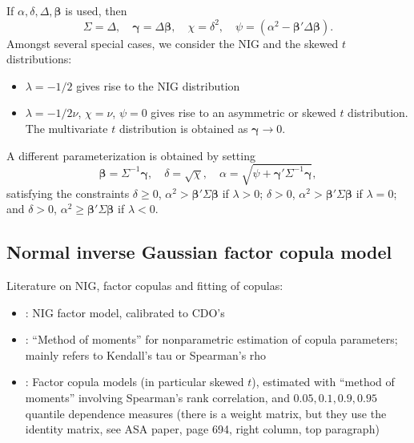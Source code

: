 \begin{definition}
If $\alpha, \delta, \Delta, \mathbf\beta$ is used, then
\begin{equation*}
  \Sigma = \Delta, \quad \mathbf\gamma = \Delta\mathbf \beta, \quad
  \chi = \delta^2, \quad \psi = (\alpha^2 - \mathbf\beta' \Delta
  \mathbf\beta). 
\end{equation*}
Amongst several special cases, we consider the NIG and the skewed $t$
distributions:
\begin{itemize}
\item $\lambda=-1/2$ gives rise to the NIG distribution
\item $\lambda=-1/2 \nu$, $\chi=\nu$, $\psi=0$ gives rise to an
  asymmetric or skewed $t$ distribution. The multivariate $t$
  distribution is obtained as $\mathbf \gamma\rightarrow 0$. 
\end{itemize}


A different parameterization is obtained by setting
\begin{equation*}
  \mathbf \beta = \Sigma^{-1}\mathbf \gamma, \quad \delta=\sqrt\chi,
  \quad \alpha = \sqrt{\psi + \mathbf \gamma' \Sigma^{-1} \mathbf
    \gamma}, 
\end{equation*}
satisfying the constraints $\delta\geq0$, $\alpha^2 > \mathbf \beta'
\Sigma\mathbf\beta$ if $\lambda>0$; $\delta>0$, $\alpha^2>
\mathbf\beta' \Sigma\mathbf \beta$ if $\lambda=0$; and $\delta>0$,
$\alpha^2\geq \mathbf\beta' \Sigma \mathbf \beta$ if $\lambda<0$. 



\end{definition}


\subsection{Normal inverse Gaussian factor copula model}
\label{sec:norm-inverse-gauss-1}

Literature on NIG, factor copulas and fitting of copulas:
\begin{itemize}
\item \citep{Kalemanova2007}: NIG factor model, calibrated to CDO's
\item \citep{Genest1987,Genest1993}: ``Method of moments'' for
  nonparametric estimation of copula parameters; mainly refers to
  Kendall's tau or Spearman's rho
\item \citep{Patton2012,Oh2013}: Factor copula models (in particular
  skewed $t$), estimated with ``method of moments'' involving
  Spearman's rank correlation, and $0.05, 0.1, 0.9, 0.95$ quantile
  dependence measures (there is a weight matrix, but they use the
  identity matrix, see ASA paper, page 694, right column, top
  paragraph)
\end{itemize}


